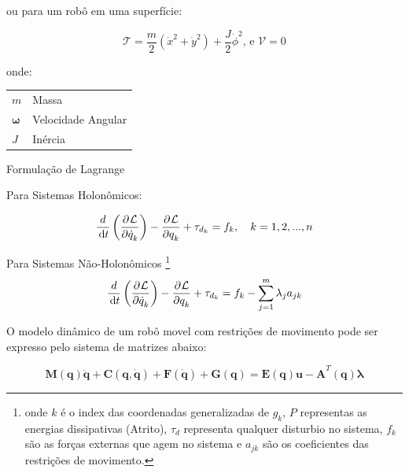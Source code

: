 ou para um robô em uma superfície:

\begin{equation*}
    \boxed{
        \mathcal{T} = \frac{m}{2}\left(\dot{x}^2+\dot{y}^2 \right)+ \frac{J}{2}\dot{\phi}^2}
    \text{, e  }
    \boxed{\mathcal{V} = 0}
\end{equation*}
               
    onde:
    \begin{tabular}{l|l}
        $m$               & Massa              \\
        $\mathbf{\omega}$ & Velocidade Angular \\
        $J$               & Inércia            \\
    \end{tabular}
              

Formulação de Lagrange

Para Sistemas Holonômicos:

\begin{equation}
    \frac{d}{\,\mathrm{d}t}\left( \dfrac{\partial^{}\mathcal{L}}{\partial \dot{q}_k^{}}\right)
    -\dfrac{\partial^{}\mathcal{L}}{\partial q_k^{}}
    +\tau_{d_k}
    = f_k, \quad k = 1,2,...,n
\end{equation}

Para Sistemas Não-Holonômicos \footnote{onde $k$ é o index das coordenadas generalizadas de $g_k$, $P$ representas as energias dissipativas (Atrito),
$\tau_d$ representa qualquer disturbio no sistema, $f_k$ são as forças externas que agem no sistema e $a_{jk}$ são os coeficientes das restrições de movimento.}
\begin{equation}
    \frac{d}{\,\mathrm{d}t}\left( \dfrac{\partial^{}\mathcal{L}}{\partial \dot{q}_k^{}}\right)
    -\dfrac{\partial^{}\mathcal{L}}{\partial q_k^{}}
    +\tau_{d_k}
    = f_k - \sum\limits^{m}_{j=1}\lambda_j a_{jk}
\end{equation}

O modelo dinâmico de um robô movel com restrições de movimento pode ser expresso pelo sistema de matrizes abaixo:

\begin{equation}
    \mathbf{M(q)\ddot{q}+ C(q, \dot{q})+ F(\dot{q})+G(q) = E(q)u -A}^T\mathbf{(q)}\boldsymbol{\lambda}
\end{equation}

